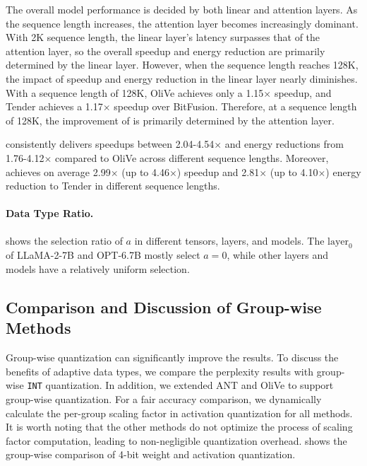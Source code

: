 The overall model performance is decided by both linear and attention layers.
As the sequence length increases, the attention layer becomes increasingly dominant.
With 2K sequence length, the linear layer's latency surpasses that of the attention layer, so the overall speedup and energy reduction are primarily determined by the linear layer.
However, when the sequence length reaches 128K, the impact of speedup and energy reduction in the linear layer nearly diminishes.
With a sequence length of 128K, OliVe achieves only a 1.15$\times$ speedup, and Tender achieves a 1.17$\times$ speedup over BitFusion.
Therefore, at a sequence length of 128K, the improvement of \proj is primarily determined by the attention layer.

\proj consistently delivers speedups between 2.04-4.54$\times$ and energy reductions from 1.76-4.12$\times$ compared to OliVe across different sequence lengths.
Moreover, \proj achieves on average 2.99$\times$ (up to 4.46$\times$) speedup and 2.81$\times$ (up to 4.10$\times$) energy reduction to Tender in different sequence lengths.



\paragraph{Data Type Ratio.}
 shows the selection ratio of $a$ in different tensors, layers, and models.
The $\text{layer}_0$ of LLaMA-2-7B and OPT-6.7B mostly select $a=0$, while other layers and models have a relatively uniform selection.







\subsection{Comparison and Discussion of Group-wise Methods} 
\label{sec:evla_group}

Group-wise quantization can significantly improve the results.
To discuss the benefits of adaptive data types, we compare the perplexity results with group-wise \texttt{INT} quantization.
In addition, we extended ANT and OliVe to support group-wise quantization.
For a fair accuracy comparison, we dynamically calculate the per-group scaling factor in activation quantization for all methods.
It is worth noting that the other methods do not optimize the process of scaling factor computation, leading to non-negligible quantization overhead.
 shows the group-wise comparison of 4-bit weight and activation quantization.

